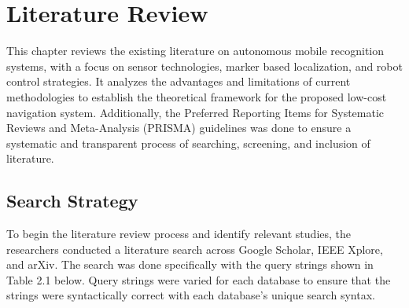 
\chapter{Literature Review}
This chapter reviews the existing literature on autonomous mobile recognition systems, with a focus on sensor technologies, marker based localization, and robot control strategies. It analyzes the advantages and limitations of current methodologies to establish the theoretical framework for the proposed low-cost navigation system. Additionally, the Preferred Reporting Items for Systematic Reviews and Meta-Analysis (PRISMA) guidelines was done to ensure a systematic and transparent process of searching, screening, and inclusion of literature.
\section{Search Strategy}
To begin the literature review process and identify relevant studies, the researchers conducted a literature search across Google Scholar, IEEE Xplore, and arXiv. The search was done specifically with the query strings shown in Table 2.1 below. Query strings were varied for each database to ensure that the strings were syntactically correct with each database’s unique search syntax.

